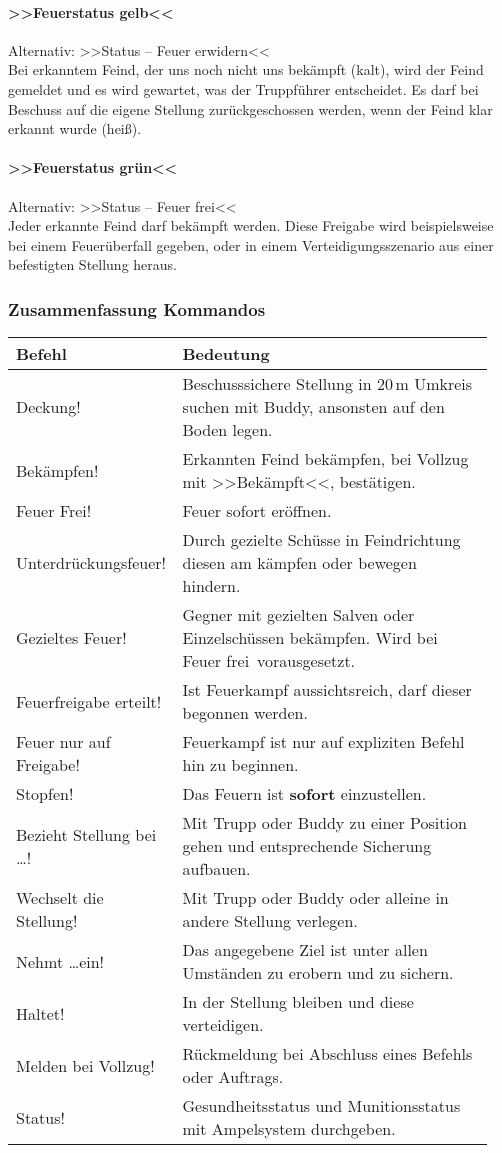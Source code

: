 \paragraph*{>>Feuerstatus gelb<<}
	Alternativ: >>Status -- Feuer erwidern<<\hfil\\
	Bei erkanntem Feind, der uns noch nicht uns bekämpft (kalt), wird der Feind gemeldet und es wird gewartet, was der Truppführer entscheidet. Es darf bei Beschuss auf die eigene Stellung zurückgeschossen werden, wenn der Feind klar erkannt wurde (heiß).

\paragraph*{>>Feuerstatus grün<<}
	Alternativ: >>Status -- Feuer frei<<\hfil\\
	Jeder erkannte Feind darf bekämpft werden. Diese Freigabe wird beispielsweise bei einem Feuerüberfall gegeben, oder in einem Verteidigungsszenario aus einer befestigten Stellung heraus.

\pagebreak	
\subsubsection{Zusammenfassung Kommandos}
	\begin{longtable}{p{0.3\linewidth}p{0.65\linewidth}} 
		\toprule
		\textbf{Befehl} & \textbf{Bedeutung}\\
		\midrule
		Deckung! & Beschusssichere Stellung in 20\,m Umkreis suchen mit Buddy, ansonsten auf den Boden legen.\\
		Bekämpfen! & Erkannten Feind bekämpfen, bei Vollzug mit >>Bekämpft<<, bestätigen.\\
		Feuer Frei! & Feuer sofort eröffnen.\\
		Unterdrückungsfeuer! & Durch gezielte Schüsse in Feindrichtung diesen am kämpfen oder bewegen hindern.\\
		Gezieltes Feuer! & Gegner mit gezielten Salven oder Einzelschüssen bekämpfen. Wird bei \glqq Feuer frei\grqq\, vorausgesetzt.\\
		Feuerfreigabe erteilt! & Ist Feuerkampf aussichtsreich, darf dieser begonnen werden.\\
		Feuer nur auf Freigabe! & Feuerkampf ist nur auf expliziten Befehl hin zu beginnen.\\
		Stopfen! & Das Feuern ist \textbf{sofort} einzustellen.\\
		Bezieht Stellung bei \dots! & Mit Trupp oder Buddy zu einer Position gehen und entsprechende Sicherung aufbauen.\\
		Wechselt die Stellung! & Mit Trupp oder Buddy oder alleine in andere Stellung verlegen.\\
		Nehmt \dots ein! & Das angegebene Ziel ist unter allen Umständen zu erobern und zu sichern.\\
		Haltet! & In der Stellung bleiben und diese verteidigen.\\
		Melden bei Vollzug! & Rückmeldung bei Abschluss eines Befehls oder Auftrags.\\
		Status! & Gesundheitsstatus und Munitionsstatus mit Ampelsystem durchgeben.\\
		\bottomrule
	\end{longtable}
